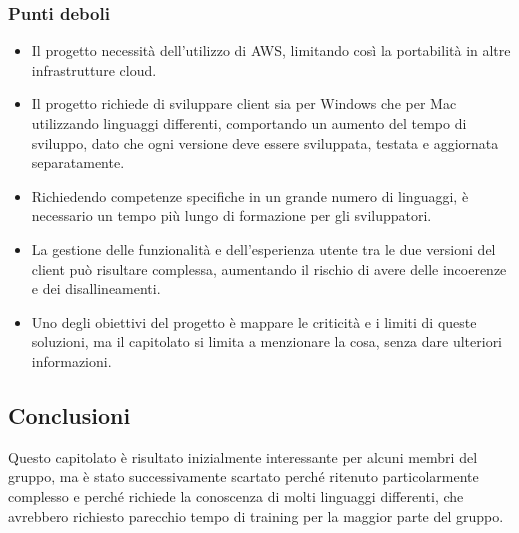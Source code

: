     \subsubsection{Punti deboli}
    \begin{itemize}
    \item Il progetto necessità dell’utilizzo di AWS, limitando così la portabilità in altre infrastrutture cloud.
    \item Il progetto richiede di sviluppare client sia per Windows che per Mac utilizzando linguaggi differenti, comportando un aumento del tempo di sviluppo, dato che ogni versione deve essere sviluppata, testata e aggiornata separatamente.
    \item Richiedendo competenze specifiche in un grande numero di linguaggi, è necessario un tempo più lungo di formazione per gli sviluppatori.
    \item La gestione delle funzionalità e dell’esperienza utente tra le due versioni del client può risultare complessa, aumentando il rischio di avere delle incoerenze e dei disallineamenti.
    \item Uno degli obiettivi del progetto è mappare le criticità e i limiti di queste soluzioni, ma il capitolato si limita a menzionare la cosa, senza dare ulteriori informazioni.
\end{itemize}
    \subsection{Conclusioni}
   Questo capitolato è risultato inizialmente interessante per alcuni membri del gruppo, ma è stato successivamente scartato perché ritenuto particolarmente complesso e perché richiede la conoscenza di molti linguaggi differenti, che avrebbero richiesto parecchio tempo di training per la maggior parte del gruppo.
